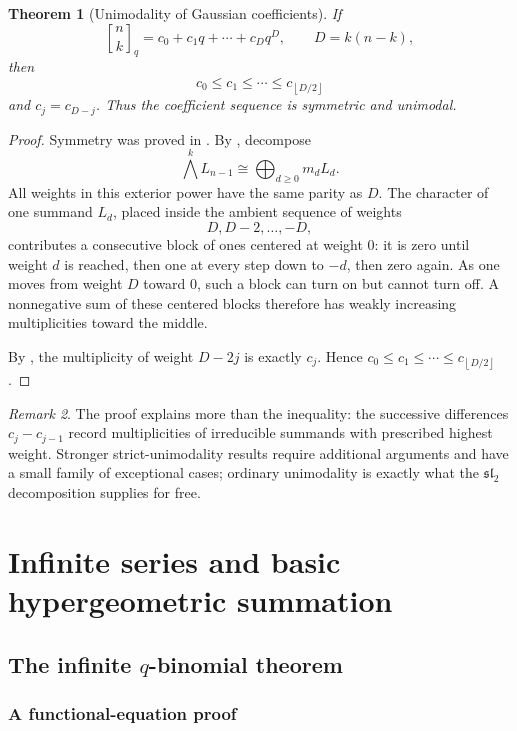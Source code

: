 \documentclass[11pt,oneside,openany]{book}
\newtheorem{theorem}{Theorem}[chapter]
\theoremstyle{definition}
\theoremstyle{remark}
\newtheorem{remark}[theorem]{Remark}
\newcommand{\qbinom}[2]{\genfrac{[}{]}{0pt}{}{#1}{#2}_{q}}
\newcommand{\floor}[1]{\left\lfloor #1\right\rfloor}
\begin{document}
\begin{theorem}[Unimodality of Gaussian coefficients]\label{thm:qbinom-unimodal}
If
\[
 \qbinom nk=c_0+c_1q+\cdots+c_Dq^D,
 \qquad D=k(n-k),
\]
then
\[
 c_0\le c_1\le\cdots\le c_{\floor{D/2}}
\]
and $c_j=c_{D-j}$.  Thus the coefficient sequence is symmetric and unimodal.
\end{theorem}

\begin{proof}
Symmetry was proved in .  By , decompose
\[
 \bigwedge^kL_{n-1}\cong\bigoplus_{d\ge0}m_dL_d.
\]
All weights in this exterior power have the same parity as $D$.  The character of one summand $L_d$, placed inside the ambient sequence of weights
\[
 D,D-2,\dots,-D,
\]
contributes a consecutive block of ones centered at weight $0$: it is zero until weight $d$ is reached, then one at every step down to $-d$, then zero again.  As one moves from weight $D$ toward $0$, such a block can turn on but cannot turn off.  A nonnegative sum of these centered blocks therefore has weakly increasing multiplicities toward the middle.

By , the multiplicity of weight $D-2j$ is exactly $c_j$.  Hence $c_0\le c_1\le\cdots\le c_{\floor{D/2}}$.
\end{proof}

\begin{remark}
The proof explains more than the inequality: the successive differences $c_j-c_{j-1}$ record multiplicities of irreducible summands with prescribed highest weight.  Stronger strict-unimodality results require additional arguments and have a small family of exceptional cases; ordinary unimodality is exactly what the $\mathfrak{sl}_2$ decomposition supplies for free.
\end{remark}


\part{Infinite series and basic hypergeometric summation}

\chapter{The infinite \texorpdfstring{$q$}{q}-binomial theorem}\label{chap:infinite-qbinomial}

\section{A functional-equation proof}
\end{document}
